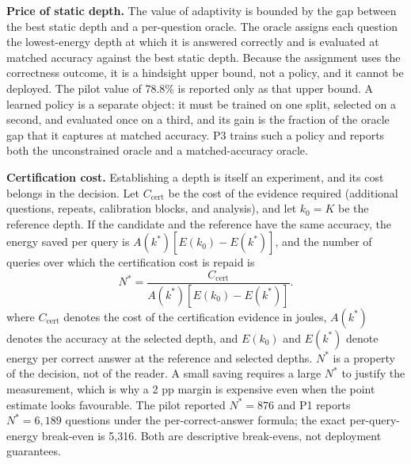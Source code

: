 \documentclass[a4paper,fleqn]{cas-sc}
\begin{document}
\textbf{Price of static depth.} The value of adaptivity is bounded by the gap between the best static depth and a per-question oracle. The oracle assigns each question the lowest-energy depth at which it is answered correctly and is evaluated at matched accuracy against the best static depth. Because the assignment uses the correctness outcome, it is a hindsight upper bound, not a policy, and it cannot be deployed. The pilot value of 78.8\% is reported only as that upper bound. A learned policy is a separate object: it must be trained on one split, selected on a second, and evaluated once on a third, and its gain is the fraction of the oracle gap that it captures at matched accuracy. P3 trains such a policy and reports both the unconstrained oracle and a matched-accuracy oracle.

\textbf{Certification cost.} Establishing a depth is itself an experiment, and its cost belongs in the decision. Let $C_{\mathrm{cert}}$ be the cost of the evidence required (additional questions, repeats, calibration blocks, and analysis), and let $k_{0}=K$ be the reference depth. If the candidate and the reference have the same accuracy, the energy saved per query is $A(k^{*})[E(k_{0})-E(k^{*})]$, and the number of queries over which the certification cost is repaid is
\begin{equation}\label{eq:nstar}
  N^{*}=\frac{C_{\mathrm{cert}}}{A(k^{*})\left[E(k_{0})-E(k^{*})\right]} .
\end{equation}
where $C_{\mathrm{cert}}$ denotes the cost of the certification evidence in joules, $A(k^{*})$ denotes the accuracy at the selected depth, and $E(k_{0})$ and $E(k^{*})$ denote energy per correct answer at the reference and selected depths. $N^{*}$ is a property of the decision, not of the reader. A small saving requires a large $N^{*}$ to justify the measurement, which is why a 2 pp margin is expensive even when the point estimate looks favourable. The pilot reported $N^{*}=876$ and P1 reports $N^{*}=6{,}189$ questions under the per-correct-answer formula; the exact per-query-energy break-even is 5{,}316. Both are descriptive break-evens, not deployment guarantees.
\end{document}
